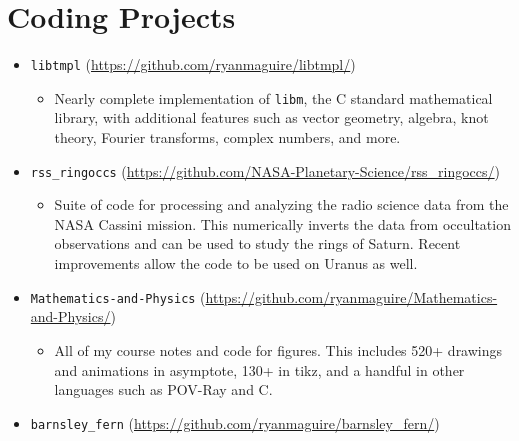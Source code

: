 \documentclass[a4paper,sans]{moderncv}
\begin{document}
    \section{Coding Projects}
        \begin{itemize}
            \item
                \texttt{libtmpl}
                (\url{https://github.com/ryanmaguire/libtmpl/})
                \begin{itemize}
                    \item
                        Nearly complete implementation of \texttt{libm}, the
                        C standard mathematical library, with additional
                        features such as vector geometry, algebra, knot theory,
                        Fourier transforms, complex numbers, and more.
                \end{itemize}
            \item
                \texttt{rss\_ringoccs}
                (\url{https://github.com/NASA-Planetary-Science/rss_ringoccs/})
                \begin{itemize}
                    \item
                        Suite of code for processing and analyzing the radio
                        science data from the NASA Cassini mission. This
                        numerically inverts the data from occultation
                        observations and can be used to study the rings of
                        Saturn. Recent improvements allow the code to be used on
                        Uranus as well.
                \end{itemize}
            \item
                \texttt{Mathematics-and-Physics}
                (\url{https://github.com/ryanmaguire/Mathematics-and-Physics/})
                \begin{itemize}
                    \item
                        All of my course notes and code for figures. This
                        includes 520+ drawings and animations in asymptote,
                        130+ in tikz, and a handful in other languages such as
                        POV-Ray and C.
                \end{itemize}
            \item
                \texttt{barnsley\_fern}
                (\url{https://github.com/ryanmaguire/barnsley_fern/})
                \begin{itemize}

\end{itemize}
\end{itemize}
\end{document}
